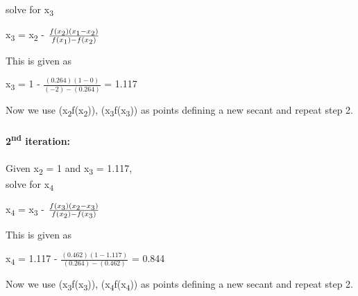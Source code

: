 \documentclass{report}
\begin{document}
            solve for x\textsubscript{3}

            \begin{center}
                x\textsubscript{3} = x\textsubscript{2} - $\frac{f(x\textsubscript{2})(x\textsubscript{1} - x\textsubscript{2})}{f(x\textsubscript{1}) - f(x\textsubscript{2})}$
            \end{center}


            This is given as 

            \begin{center}
                x\textsubscript{3} = 1 - $\frac{(0.264)(1 - 0)}{(-2) - (0.264)}$ = 1.117
            \end{center}

            Now we use (x\textsubscript{2}f(x\textsubscript{2})), (x\textsubscript{3}f(x\textsubscript{3})) as points defining a new secant
             and repeat step 2.\\\\













             \textbf{2\textsuperscript{nd} iteration:}\\\\
            Given x\textsubscript{2} = 1 and x\textsubscript{3} = 1.117,\\

            solve for x\textsubscript{4}

            \begin{center}
                x\textsubscript{4} = x\textsubscript{3} - $\frac{f(x\textsubscript{3})(x\textsubscript{2} - x\textsubscript{3})}{f(x\textsubscript{2}) - f(x\textsubscript{3})}$
            \end{center}


            This is given as 

            \begin{center}
                x\textsubscript{4} = 1.117 - $\frac{(0.462)(1 - 1.117)}{(0.264) - (0.462)}$ = 0.844
            \end{center}

            Now we use (x\textsubscript{3}f(x\textsubscript{3})), (x\textsubscript{4}f(x\textsubscript{4})) as points defining a new secant
             and repeat step 2.\\\\
\end{document}
